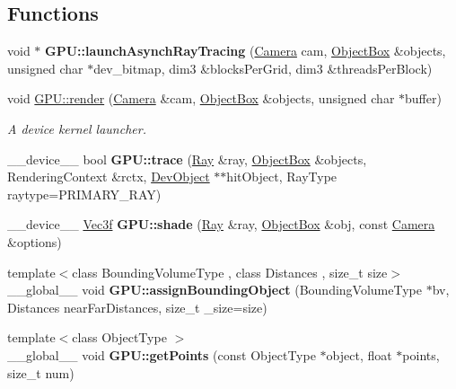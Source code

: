 \subsection*{Functions}
\begin{DoxyCompactItemize}
\item 
void $\ast$ {\bfseries G\+P\+U\+::launch\+Asynch\+Ray\+Tracing} (\hyperlink{struct_camera}{Camera} cam, \hyperlink{class_object_box}{Object\+Box} \&objects, unsigned char $\ast$dev\+\_\+bitmap, dim3 \&blocks\+Per\+Grid, dim3 \&threads\+Per\+Block)
\item 
void \hyperlink{group__rendering_gadd1c99922e3b5c249fac22f8946b5e57}{G\+P\+U\+::render} (\hyperlink{struct_camera}{Camera} \&cam, \hyperlink{class_object_box}{Object\+Box} \&objects, unsigned char $\ast$buffer)
\begin{DoxyCompactList}\small\item\em A device kernel launcher. \end{DoxyCompactList}\item 
\+\_\+\+\_\+device\+\_\+\+\_\+ bool {\bfseries G\+P\+U\+::trace} (\hyperlink{class_ray}{Ray} \&ray, \hyperlink{class_object_box}{Object\+Box} \&objects, Rendering\+Context \&rctx, \hyperlink{class_dev_object}{Dev\+Object} $\ast$$\ast$hit\+Object, Ray\+Type raytype=P\+R\+I\+M\+A\+R\+Y\+\_\+\+R\+AY)
\item 
\+\_\+\+\_\+device\+\_\+\+\_\+ \hyperlink{class_vec3}{Vec3f} {\bfseries G\+P\+U\+::shade} (\hyperlink{class_ray}{Ray} \&ray, \hyperlink{class_object_box}{Object\+Box} \&obj, const \hyperlink{struct_camera}{Camera} \&options)
\item 
{\footnotesize template$<$class Bounding\+Volume\+Type , class Distances , size\+\_\+t size$>$ }\\\+\_\+\+\_\+global\+\_\+\+\_\+ void {\bfseries G\+P\+U\+::assign\+Bounding\+Object} (Bounding\+Volume\+Type $\ast$bv, Distances near\+Far\+Distances, size\+\_\+t \+\_\+size=size)\hypertarget{r_t_tracer_2include_2rendering_8cuh_a81d1631d860fe534326c9dcb30d1c2ec}{}\label{r_t_tracer_2include_2rendering_8cuh_a81d1631d860fe534326c9dcb30d1c2ec}

\item 
{\footnotesize template$<$class Object\+Type $>$ }\\\+\_\+\+\_\+global\+\_\+\+\_\+ void {\bfseries G\+P\+U\+::get\+Points} (const Object\+Type $\ast$object, float $\ast$points, size\+\_\+t num)\hypertarget{r_t_tracer_2include_2rendering_8cuh_ae20d656e78c761dae4199fd9e7a547be}{}\label{r_t_tracer_2include_2rendering_8cuh_ae20d656e78c761dae4199fd9e7a547be}


\end{DoxyCompactItemize}
